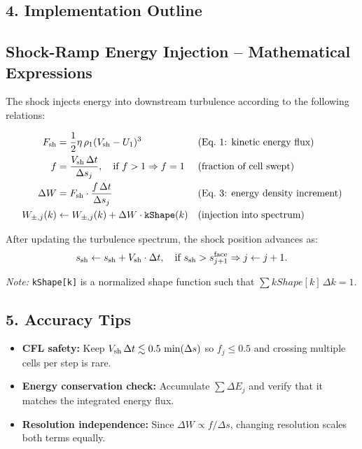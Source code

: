 \subsection*{4. Implementation Outline}

\subsection*{Shock-Ramp Energy Injection – Mathematical Expressions}

The shock injects energy into downstream turbulence according to the following relations:

\begin{align}
F_{\rm sh} &= \frac{1}{2} \eta\, \rho_1 (V_{\rm sh} - U_1)^3 && \text{(Eq.~1: kinetic energy flux)} \\
f &= \frac{V_{\rm sh} \, \Delta t}{\Delta s_j}, \quad \text{if } f > 1 \Rightarrow f = 1 && \text{(fraction of cell swept)} \\
\Delta W &= F_{\rm sh} \cdot \frac{f \, \Delta t}{\Delta s_j} && \text{(Eq.~3: energy density increment)} \\
W_{\pm, j}(k) &\leftarrow W_{\pm, j}(k) + \Delta W \cdot \texttt{kShape}(k) && \text{(injection into spectrum)}
\end{align}

After updating the turbulence spectrum, the shock position advances as:
\begin{equation}
s_{\rm sh} \leftarrow s_{\rm sh} + V_{\rm sh} \cdot \Delta t,
\quad \text{if } s_{\rm sh} > s_{j+1}^{\text{face}} \Rightarrow j \leftarrow j + 1.
\end{equation}


\noindent\textit{Note:} \texttt{kShape[k]} is a normalized shape function such that $\sum kShape[k]\,\Delta k = 1$.

\subsection*{5. Accuracy Tips}

\begin{itemize}
\item \textbf{CFL safety:} Keep $V_{\rm sh}\,\Delta t \lesssim 0.5\,\min(\Delta s)$ so $f_j \le 0.5$ and crossing multiple cells per step is rare.
\item \textbf{Energy conservation check:} Accumulate $\sum \Delta E_j$ and verify that it matches the integrated energy flux.
\item \textbf{Resolution independence:} Since $\Delta W \propto f/\Delta s$, changing resolution scales both terms equally.
\end{itemize}

